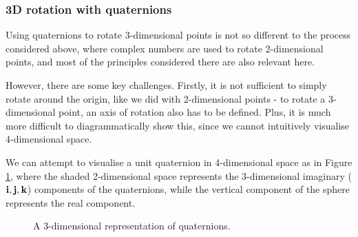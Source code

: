 \documentclass[10pt]{article}
\begin{document}
\subsubsection{3D rotation with quaternions}

Using quaternions to rotate 3-dimensional points is not so different to the process considered above, where complex numbers are used to rotate 2-dimensional points, and most of the principles considered there are also relevant here.

However, there are some key challenges. Firstly, it is not sufficient to simply rotate around the origin, like we did with 2-dimensional points - to rotate a 3-dimensional point, an axis of rotation also has to be defined. Plus, it is much more difficult to diagrammatically show this, since we cannot intuitively visualise 4-dimensional space.

We can attempt to visualise a unit quaternion in 4-dimensional space as in Figure \ref{SphereQuaternionRepresentation}, where the shaded 2-dimensional space represents the 3-dimensional imaginary ($\vb{i, j, k}$) components of the quaternions, while the vertical component of the sphere represents the real component. 

\begin{figure}[ht]
    \centering
    \caption{A 3-dimensional representation of quaternions. \cite{Penguin}}
    \label{SphereQuaternionRepresentation}
\end{figure}
\end{document}
